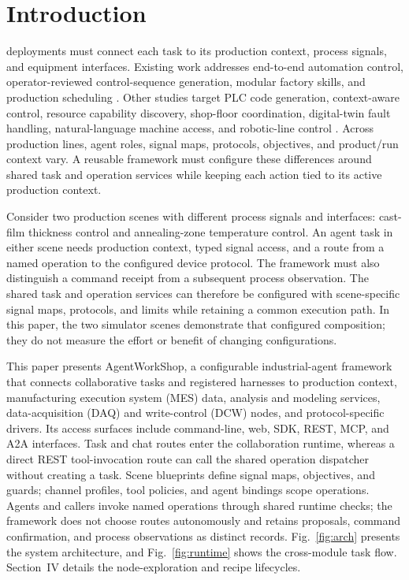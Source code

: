 \section{Introduction}
 deployments must connect each task to its
production context, process signals, and equipment interfaces. Existing work
addresses end-to-end automation control, operator-reviewed control-sequence
generation, modular factory skills, and production scheduling
\cite{xia2025control,huang2026made,koehle2026llmdriven,waseem2026pretrained}.
Other studies target PLC code generation, context-aware control, resource
capability discovery, shop-floor coordination, digital-twin fault handling,
natural-language machine access, and robotic-line control
\cite{liu2026agents4plc,wu2025instructmpc,lim2025llmenabled,zhao2026shopfloor,gill2025llmdt,hofmann2025nlc}.
Across production lines, agent roles, signal maps, protocols, objectives, and
product/run context vary. A reusable framework must configure these
differences around shared task and operation services while keeping each
action tied to its active production context.

Consider two production scenes with different process signals and interfaces:
cast-film thickness control and annealing-zone temperature control. An agent
task in either scene needs production context, typed signal access, and a
route from a named operation to the configured device protocol. The framework
must also distinguish a command receipt from a subsequent process
observation. The shared task and operation services can therefore be
configured with scene-specific signal maps, protocols, and limits while
retaining a common execution path. In this paper, the two simulator scenes
demonstrate that configured composition; they do not measure the effort or
benefit of changing configurations.

This paper presents AgentWorkShop, a configurable industrial-agent framework
that connects collaborative tasks and registered harnesses to production
context, manufacturing execution system (MES) data, analysis and modeling
services, data-acquisition (DAQ) and write-control (DCW) nodes, and
protocol-specific drivers. Its access surfaces include command-line, web,
SDK, REST, MCP, and A2A interfaces. Task and chat routes enter the
collaboration runtime, whereas a direct REST tool-invocation route can call
the shared operation dispatcher without creating a task.
Scene blueprints define signal maps, objectives, and guards; channel profiles,
tool policies, and agent bindings scope operations. Agents and callers invoke
named operations through shared runtime checks; the framework does not choose
routes autonomously and retains proposals, command confirmation, and process
observations as distinct records. Fig.~\ref{fig:arch} presents the system
architecture, and Fig.~\ref{fig:runtime} shows the cross-module task flow.
Section~IV details the node-exploration and recipe lifecycles.

